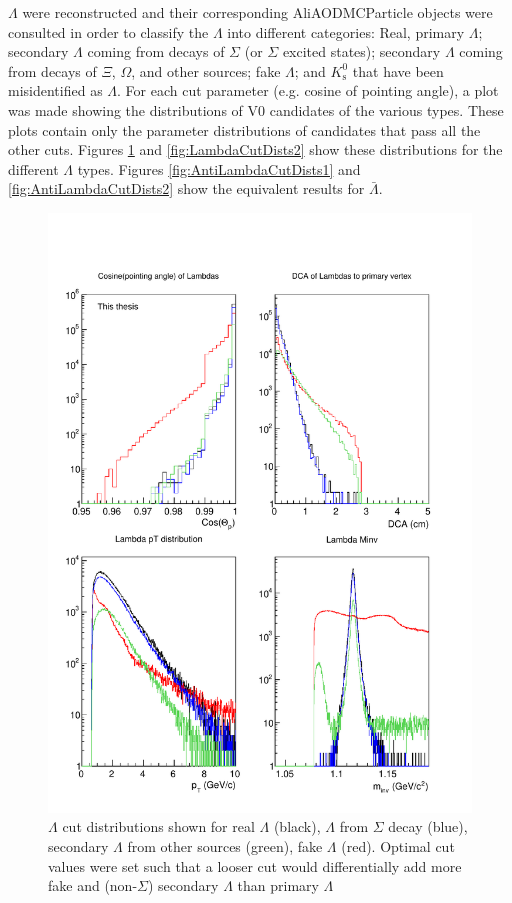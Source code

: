 $\Lambda$ were reconstructed and their corresponding AliAODMCParticle objects were consulted in order to classify the $\Lambda$ into different categories: Real, primary $\Lambda$; secondary $\Lambda$ coming from decays of $\Sigma$ (or $\Sigma$ excited states); secondary $\Lambda$ coming from decays of $\Xi$, $\Omega$, and other sources; fake $\Lambda$; and $K^0_\mathrm{s}$ that have been misidentified as $\Lambda$.  For each cut parameter (e.g. cosine of pointing angle), a plot was made showing the distributions of V0 candidates of the various types.  These plots contain only the parameter distributions of candidates that pass all the other cuts.  Figures \ref{fig:LambdaCutDists1} and \ref{fig:LambdaCutDists2} show these distributions for the different $\Lambda$ types.  Figures \ref{fig:AntiLambdaCutDists1} and \ref{fig:AntiLambdaCutDists2} show the equivalent results for $\bar{\Lambda}$.

\begin{figure}
\includegraphics[width=36pc]{Figures/2014-03-31-Distribution-Lambda-4Types-CosP-DCA-pT-Minv.pdf}
\caption[$\Lambda$ cut distributions]{$\Lambda$ cut distributions shown for real $\Lambda$ (black), $\Lambda$ from $\Sigma$ decay (blue), secondary $\Lambda$ from other sources (green), fake $\Lambda$ (red). Optimal cut values were set such that a looser cut would differentially add more fake and (non-$\Sigma$) secondary $\Lambda$ than primary $\Lambda$}
\label{fig:LambdaCutDists1}
\end{figure}

